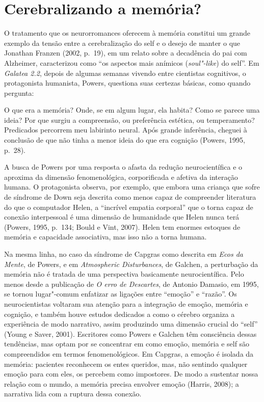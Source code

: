 \chapter{Cerebralizando a memória?}

O tratamento que os neurorromances oferecem à memória constitui um
grande exemplo da tensão entre a cerebralização do self e o desejo de
manter o que Jonathan Franzen (2002, p.~19), em um relato sobre a
decadência do pai com Alzheimer, caracterizou como ``os aspectos mais
anímicos (\emph{soul"-like}) do self''. Em \emph{Galatea 2.2}, depois de
algumas semanas vivendo entre cientistas cognitivos, o protagonista
humanista, Powers, questiona suas certezas básicas, como quando
pergunta:

O que era a memória? Onde, se em algum lugar, ela habita? Como se parece
uma ideia? Por que surgiu a compreensão, ou preferência estética, ou
temperamento? Predicados percorrem meu labirinto neural. Após grande
inferência, cheguei à conclusão de que não tinha a menor ideia do que
era cognição (Powers, 1995, p.~28).

A busca de Powers por uma resposta o afasta da redução neurocientífica e
o aproxima da dimensão fenomenológica, corporificada e afetiva da
interação humana. O protagonista observa, por exemplo, que embora uma
criança que sofre de síndrome de Down seja descrita como menos capaz de
compreender literatura do que o computador Helen, a ``incrível empatia
corporal'' que o torna capaz de conexão interpessoal é uma dimensão de
humanidade que Helen nunca terá (Powers, 1995, p.~134; Bould e Vint,
2007). Helen tem enormes estoques de memória e capacidade associativa,
mas isso não a torna humana.

Na mesma linha, no caso da síndrome de Capgras como descrita em
\emph{Ecos da Mente}, de Powers, e em \emph{Atmospheric Disturbances},
de Galchen, a perturbação da memória não é tratada de uma perspectiva
basicamente neurocientífica. Pelo menos desde a publicação de \emph{O
erro de Descartes}, de Antonio Damasio, em 1995, se tornou lugar"-comum
enfatizar as ligações entre ``emoção'' e ``razão''. Os neurocientistas
voltaram sua atenção para a integração de emoção, memória e cognição, e
também houve estudos dedicados a como o cérebro organiza a experiência
de modo narrativo, assim produzindo uma dimensão crucial do ``self''
(Young e Saver, 2001). Escritores como Powers e Galchen têm consciência
dessas tendências, mas optam por se concentrar em como emoção, memória e
self são compreendidos em termos fenomenológicos. Em Capgras, a emoção é
isolada da memória: pacientes reconhecem os entes queridos, mas, não
sentindo qualquer emoção para com eles, os percebem como impostores. De
modo a sustentar nossa relação com o mundo, a memória precisa envolver
emoção (Harris, 2008); a narrativa lida com a ruptura dessa conexão.

